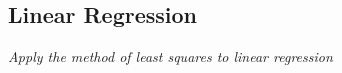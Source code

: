 \subsection[linear regression]{Linear Regression}

\textit{Apply the method of least squares to linear regression}

\vspace{.5cm}